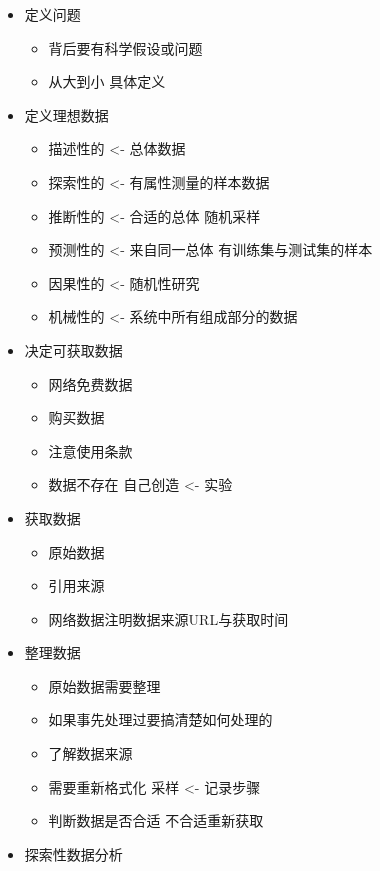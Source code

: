 \documentclass[
]{book}
\providecommand{\tightlist}{%
  \setlength{\itemsep}{0pt}\setlength{\parskip}{0pt}}
\begin{document}
\begin{itemize}
\item
  定义问题

  \begin{itemize}
  \tightlist
  \item
    背后要有科学假设或问题
  \item
    从大到小 具体定义
  \end{itemize}
\item
  定义理想数据

  \begin{itemize}
  \tightlist
  \item
    描述性的 \textless- 总体数据
  \item
    探索性的 \textless- 有属性测量的样本数据
  \item
    推断性的 \textless- 合适的总体 随机采样
  \item
    预测性的 \textless- 来自同一总体 有训练集与测试集的样本
  \item
    因果性的 \textless- 随机性研究
  \item
    机械性的 \textless- 系统中所有组成部分的数据
  \end{itemize}
\item
  决定可获取数据

  \begin{itemize}
  \tightlist
  \item
    网络免费数据
  \item
    购买数据
  \item
    注意使用条款
  \item
    数据不存在 自己创造 \textless- 实验
  \end{itemize}
\item
  获取数据

  \begin{itemize}
  \tightlist
  \item
    原始数据
  \item
    引用来源
  \item
    网络数据注明数据来源URL与获取时间
  \end{itemize}
\item
  整理数据

  \begin{itemize}
  \tightlist
  \item
    原始数据需要整理
  \item
    如果事先处理过要搞清楚如何处理的
  \item
    了解数据来源
  \item
    需要重新格式化 采样 \textless- 记录步骤
  \item
    判断数据是否合适 不合适重新获取
  \end{itemize}
\item
  探索性数据分析


\end{itemize}
\end{document}
